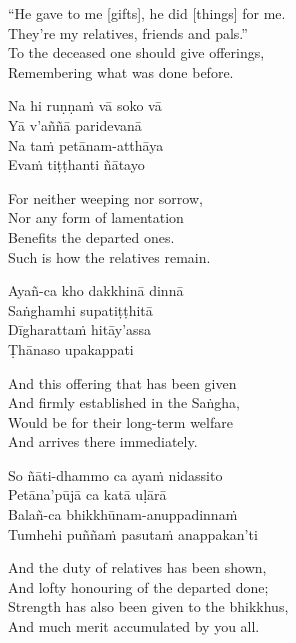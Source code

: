 \begin{english-verses}
  ``He gave to me [gifts], he did [things] for me.\\
  They're my relatives, friends and pals.''\\
  To the deceased one should give offerings,\\
  Remembering what was done before.
\end{english-verses}

\begin{pali-hang-continued}
Na hi ruṇṇaṁ vā soko vā\\
Yā v'aññā paridevanā\\
Na taṁ petānam-atthāya\\
Evaṁ tiṭṭhanti ñātayo
\end{pali-hang-continued}

\begin{english-verses}
  For neither weeping nor sorrow,\\
  Nor any form of lamentation\\
  Benefits the departed ones.\\
  Such is how the relatives remain.
\end{english-verses}

\begin{pali-hang-continued}
Ayañ-ca kho dakkhinā dinnā\\
Saṅghamhi supatiṭṭhitā\\
Dīgharattaṁ hitāy'assa\\
Ṭhānaso upakappati
\end{pali-hang-continued}

\begin{english-verses}
  And this offering that has been given\\
  And firmly established in the Saṅgha,\\
  Would be for their long-term welfare\\
  And arrives there immediately.
\end{english-verses}

\begin{pali-hang-continued}
So ñāti-dhammo ca ayaṁ nidassito\\
Petāna'pūjā ca katā uḷārā\\
Balañ-ca bhikkhūnam-anuppadinnaṁ\\
Tumhehi puññaṁ pasutaṁ anappakan'ti
\end{pali-hang-continued}

\begin{english-verses}
  And the duty of relatives has been shown,\\
  And lofty honouring of the departed done;\\
  Strength has also been given to the bhikkhus,\\
  And much merit accumulated by you all.
\end{english-verses}

